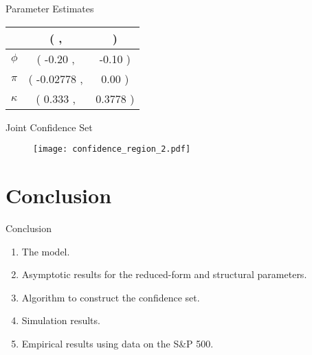 \documentclass[smaller, aspectratio=169]{beamer}
\begin{document}
\begin{frame}[c]{Parameter Estimates}
\begin{minipage}{.49\textwidth}
\begin{table}[htb]
            \begin{tabularx}{.75\textwidth}{X | >{{(}} S[table-space-text-pre={(}] <{{,\,}}
              S[table-space-text-pre={\hspace{-1.5cm}}] <{{)}}}
%
            \toprule
            &  \\
            \midrule
            $\phi$   & -0.20 & -0.10    \\
            $\pi$    & -0.02778 & 0.00   \\
            $\kappa$   & 0.333 & 0.3778  \\
            \bottomrule 
          \end{tabularx}
        \end{table}
   \end{minipage}


\end{frame}



\begin{frame}[c]{Joint Confidence Set}
    \begin{figure}[htb]
    	
    	\centering
    	\label{fig:confidence_region}
    	
    	\texttt{[image: confidence\_region\_2.pdf]}
    \end{figure}

\end{frame}

\section{Conclusion}

\begin{frame}[c]{Conclusion}

  \begin{enumerate}
%
      \item[\cmark] The model.
      \bigskip
%
  \item[\cmark] Asymptotic results for the reduced-form and structural parameters.
      \bigskip
%
  \item[\cmark] Algorithm to construct the confidence set.
      \bigskip
%
    \item[\cmark] Simulation results. 
      \bigskip
%
    \item[\cmark] Empirical results using data on the S\&P 500.
%
  \end{enumerate}

\end{frame}
\end{document}
